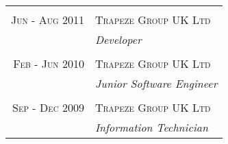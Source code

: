 \begin{tabular}{r|p{11cm}}
\multicolumn{2}{c}{} \\


\textsc{Jun - Aug 2011} & \textsc{Trapeze Group UK Ltd}\\ 
& \emph{Developer}\\

\multicolumn{2}{c}{} \\


\textsc{Feb - Jun 2010} & \textsc{Trapeze Group UK Ltd}\\ 
& \emph{Junior Software Engineer}\\

\multicolumn{2}{c}{} \\


\textsc{Sep - Dec 2009} & \textsc{Trapeze Group UK Ltd}\\ 
& \emph{Information Technician}\\

\end{tabular}